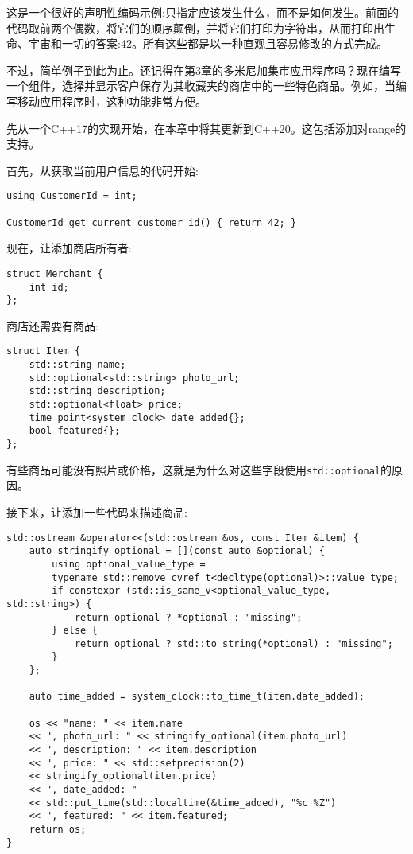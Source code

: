 这是一个很好的声明性编码示例:只指定应该发生什么，而不是如何发生。前面的代码取前两个偶数，将它们的顺序颠倒，并将它们打印为字符串，从而打印出生命、宇宙和一切的答案:42。所有这些都是以一种直观且容易修改的方式完成。


不过，简单例子到此为止。还记得在第3章的多米尼加集市应用程序吗？现在编写一个组件，选择并显示客户保存为其收藏夹的商店中的一些特色商品。例如，当编写移动应用程序时，这种功能非常方便。

先从一个C++17的实现开始，在本章中将其更新到C++20。这包括添加对range的支持。

首先，从获取当前用户信息的代码开始:

\begin{lstlisting}[style=styleCXX]
using CustomerId = int;

CustomerId get_current_customer_id() { return 42; }
\end{lstlisting}

现在，让添加商店所有者:

\begin{lstlisting}[style=styleCXX]
struct Merchant {
	int id;
};
\end{lstlisting}

商店还需要有商品:

\begin{lstlisting}[style=styleCXX]
struct Item {
	std::string name;
	std::optional<std::string> photo_url;
	std::string description;
	std::optional<float> price;
	time_point<system_clock> date_added{};
	bool featured{};
};
\end{lstlisting}

有些商品可能没有照片或价格，这就是为什么对这些字段使用\texttt{std::optional}的原因。

接下来，让添加一些代码来描述商品:

\begin{lstlisting}[style=styleCXX]
std::ostream &operator<<(std::ostream &os, const Item &item) {
	auto stringify_optional = [](const auto &optional) {
		using optional_value_type =
		typename std::remove_cvref_t<decltype(optional)>::value_type;
		if constexpr (std::is_same_v<optional_value_type, std::string>) {
			return optional ? *optional : "missing";
		} else {
			return optional ? std::to_string(*optional) : "missing";
		}
	};

	auto time_added = system_clock::to_time_t(item.date_added);
	
	os << "name: " << item.name
	<< ", photo_url: " << stringify_optional(item.photo_url)
	<< ", description: " << item.description
	<< ", price: " << std::setprecision(2)
	<< stringify_optional(item.price)
	<< ", date_added: "
	<< std::put_time(std::localtime(&time_added), "%c %Z")
	<< ", featured: " << item.featured;
	return os;
}
\end{lstlisting}

